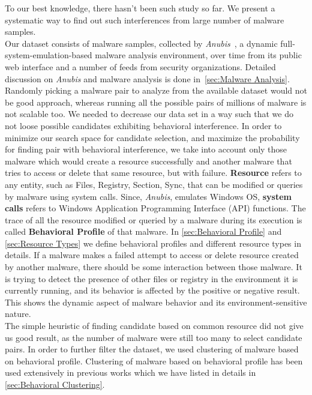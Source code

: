 To our best knowledge, there hasn't been such study so far.
We present a systematic way to find out such interferences from large number of malware samples.\\
Our dataset consists of {\gettotalmalwarei{}} malware samples, collected by \emph{Anubis}~\cite[]{anubis}, a dynamic full-system-emulation-based malware analysis environment, over time from its public web interface and a number of feeds from security organizations.
Detailed discussion on \emph{Anubis} and malware analysis is done in~\autoref{sec:Malware Analysis}.
Randomly picking a malware pair to analyze from the available dataset would not be good approach, whereas running all the possible pairs of millions of malware is not scalable too.
We needed to decrease our data set in a way such that we do not loose possible candidates exhibiting behavioral interference.
In order to minimize our search space for candidate selection, and maximize the probability for finding pair with behavioral interference, we take into account only those malware which would create a resource successfully and another malware that tries to access or delete that same resource, but with failure.
\textbf{Resource} refers to any entity, such as Files, Registry, Section, Sync, that can be modified or queries by malware using system calls.
Since, \emph{Anubis}, emulates Windows OS, \textbf{system calls} refers to Windows Application Programming Interface (API) functions.
The trace of all the resource modified or queried by a malware during its execution is called \textbf{Behavioral Profile} of that malware.
In \autoref{sec:Behavioral Profile} and \autoref{sec:Resource Types} we define behavioral profiles and different resource types in details.
If a malware makes a failed attempt to access or delete resource created by another malware, there should be some interaction between those malware.
It is trying to detect the presence of other files or registry in the environment it is currently running, and its behavior is affected by the positive or negative result.
This shows the dynamic aspect of malware behavior and its environment-sensitive nature.\\
The simple heuristic of finding candidate based on common resource did not give us good result, as the number of malware were still too many to select candidate pairs.
In order to further filter the dataset, we used clustering of malware based on behavioral profile.
Clustering of malware based on behavioral profile has been used extensively in previous works which we have listed in details in \autoref{sec:Behavioral Clustering}.
